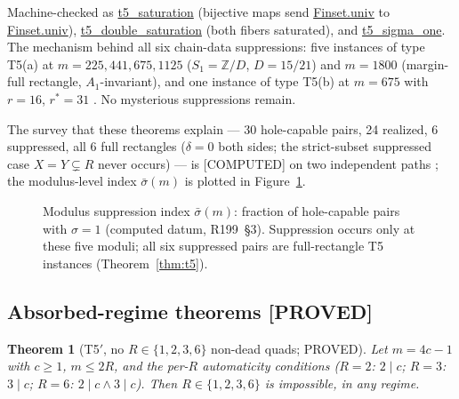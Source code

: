 \documentclass[11pt,a4paper]{article}
\newtheorem{theorem}{Theorem}
\theoremstyle{definition}
\begin{document}
Machine-checked as \url{t5_saturation} (bijective maps send
\url{Finset.univ} to \url{Finset.univ}),
\url{t5_double_saturation} (both fibers saturated), and
\url{t5_sigma_one}. The mechanism behind all six chain-data
suppressions: five instances of type T5(a) at $m=225,441,675,1125$
($S_1=\mathbb{Z}/D$, $D=15/21$) and $m=1800$ (margin-full rectangle,
$A_1$-invariant), and one instance of type T5(b) at $m=675$ with
$r=16$, $r^*=31$ \cite{D199}. No mysterious suppressions remain.

The survey that these theorems explain --- 30 hole-capable pairs, 24
realized, 6 suppressed, all 6 full rectangles ($\delta=0$ both sides;
the strict-subset suppressed case $X=Y\subsetneq R$ never occurs) ---
is [COMPUTED] on two independent paths \cite{D199}; the modulus-level
index $\bar\sigma(m)$ is plotted in
Figure~\ref{fig:sigmabar}.

\begin{figure}[t]
  \centering
  \caption{Modulus suppression index $\bar\sigma(m)$: fraction of
    hole-capable pairs with $\sigma=1$ (computed datum, R199~\S3).
    Suppression occurs only at these five moduli; all six suppressed
    pairs are full-rectangle T5 instances (Theorem~\ref{thm:t5}).}
  \label{fig:sigmabar}
\end{figure}

\subsection{Absorbed-regime theorems [PROVED]}

\begin{theorem}[T5$'$, no $R\in\{1,2,3,6\}$ non-dead quads; PROVED]
  \label{thm:t5prime}
  Let $m=4c-1$ with $c\ge1$, $m\le2R$, and the per-$R$ automaticity
  conditions ($R=2$: $2\mid c$; $R=3$: $3\mid c$; $R=6$: $2\mid c\land
  3\mid c$). Then $R\in\{1,2,3,6\}$ is impossible, in any regime.
\end{theorem}
\end{document}
